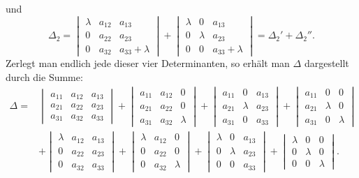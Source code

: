 \documentclass[11pt]{article}
\begin{document}
und
\[
\varDelta_2 = \begin{vmatrix} \lambda & a_{12} & a_{13}\\ 0 & a_{22} & a_{23}\\ 0 & a_{32} & a_{33}+\lambda\end{vmatrix}
+ \begin{vmatrix} \lambda & 0 & a_{13}\\ 0 & \lambda & a_{23}\\ 0 & 0 & a_{33}+\lambda\end{vmatrix}
= \varDelta_2'+\varDelta_2''.
\]
Zerlegt man endlich jede dieser vier Determinanten, so erhält man $\varDelta$ dargestellt durch die Summe:
\[
\begin{aligned}
\varDelta ={}& \begin{vmatrix} a_{11} & a_{12} & a_{13}\\ a_{21} & a_{22} & a_{23}\\ a_{31} & a_{32} & a_{33}\end{vmatrix}
+ \begin{vmatrix} a_{11} & a_{12} & 0\\ a_{21} & a_{22} & 0\\ a_{31} & a_{32} & \lambda\end{vmatrix}
+ \begin{vmatrix} a_{11} & 0 & a_{13}\\ a_{21} & \lambda & a_{23}\\ a_{31} & 0 & a_{33}\end{vmatrix}
+ \begin{vmatrix} a_{11} & 0 & 0\\ a_{21} & \lambda & 0\\ a_{31} & 0 & \lambda\end{vmatrix}\\
&+ \begin{vmatrix} \lambda & a_{12} & a_{13}\\ 0 & a_{22} & a_{23}\\ 0 & a_{32} & a_{33}\end{vmatrix}
+ \begin{vmatrix} \lambda & a_{12} & 0\\ 0 & a_{22} & 0\\ 0 & a_{32} & \lambda\end{vmatrix}
+ \begin{vmatrix} \lambda & 0 & a_{13}\\ 0 & \lambda & a_{23}\\ 0 & 0 & a_{33}\end{vmatrix}
+ \begin{vmatrix} \lambda & 0 & 0\\ 0 & \lambda & 0\\ 0 & 0 & \lambda\end{vmatrix}.
\end{aligned}
\]
\end{document}
